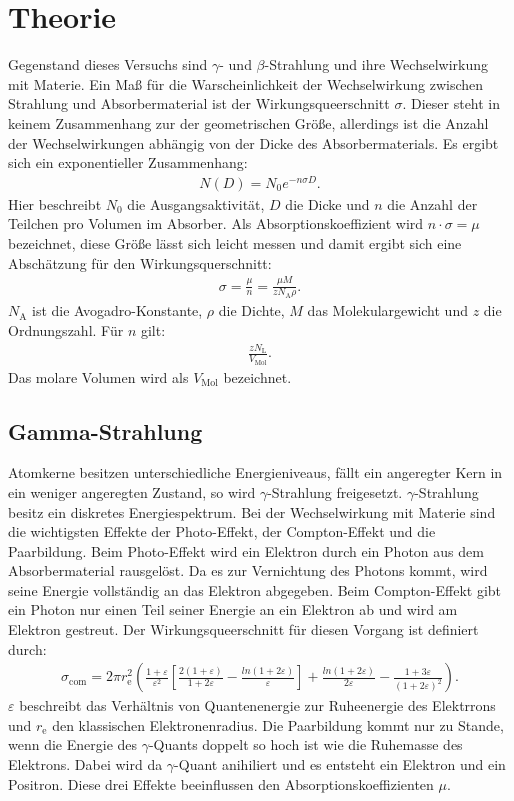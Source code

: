 \section{Theorie}
\label{sec:Theorie}
Gegenstand dieses Versuchs sind $\gamma$- und $\beta$-Strahlung und ihre Wechselwirkung mit Materie.
Ein Maß für die Warscheinlichkeit der Wechselwirkung zwischen Strahlung und Absorbermaterial ist der
Wirkungsqueerschnitt $\sigma$. Dieser steht in keinem Zusammenhang zur der geometrischen Größe, allerdings
ist die Anzahl der Wechselwirkungen abhängig von der Dicke des Absorbermaterials. Es ergibt sich ein
exponentieller Zusammenhang:
\begin{align}
N(D)=N_\mathrm{0}e^{-n\sigma D}.\label{eqn:abs}
\end{align}
Hier beschreibt $N_\mathrm{0}$ die Ausgangsaktivität, $D$ die Dicke und $n$ die Anzahl der Teilchen pro
Volumen im Absorber. Als Absorptionskoeffizient wird $n\cdot\sigma=\mu$ bezeichnet, diese Größe lässt sich
leicht messen und damit ergibt sich eine Abschätzung für den Wirkungsquerschnitt:
\begin{align}
\sigma=\frac{\mu}{n}=\frac{\mu M}{zN_\mathrm{A}\rho}.
\end{align}
$N_\mathrm{A}$ ist die Avogadro-Konstante, $\rho$ die Dichte, $M$ das Molekulargewicht und $z$ die Ordnungszahl.
Für $n$ gilt:
\begin{align}
\frac{zN_\mathrm{L}}{V_\mathrm{Mol}}.
\end{align}
Das molare Volumen wird als $V_\mathrm{Mol}$ bezeichnet.
\subsection{Gamma-Strahlung}
Atomkerne besitzen unterschiedliche Energieniveaus, fällt ein angeregter Kern in ein weniger angeregten Zustand, so
wird $\gamma$-Strahlung freigesetzt. $\gamma$-Strahlung besitz ein diskretes Energiespektrum.
Bei der Wechselwirkung mit Materie sind die wichtigsten Effekte der Photo-Effekt, der Compton-Effekt und
die Paarbildung.
Beim Photo-Effekt wird ein Elektron durch ein Photon aus dem Absorbermaterial rausgelöst. Da es zur Vernichtung des
Photons kommt, wird seine Energie vollständig an das Elektron abgegeben.
Beim Compton-Effekt gibt ein Photon nur einen Teil seiner Energie an ein Elektron ab und wird am Elektron gestreut.
Der Wirkungsqueerschnitt für diesen Vorgang ist definiert durch:
\begin{align}
\sigma_\mathrm{com}=2\pi r_\mathrm{e}^2\left(\frac{1+\varepsilon}{\varepsilon^2}\left[\frac{2(1+\varepsilon)}{1+2\varepsilon}-\frac{ln(1+2\varepsilon)}{\varepsilon}\right]+\frac{ln(1+2\varepsilon)}{2\varepsilon}-\frac{1+3\varepsilon}{(1+2\varepsilon)^2}\right)\label{eqn:sigma}.
\end{align}
$\varepsilon$ beschreibt das Verhältnis von Quantenenergie zur Ruheenergie des Elektrrons und $r_\mathrm{e}$
den klassischen Elektronenradius.
Die Paarbildung kommt nur zu Stande, wenn die Energie des $\gamma$-Quants doppelt so hoch ist wie
die Ruhemasse des Elektrons. Dabei wird da $\gamma$-Quant anihiliert und es entsteht ein Elektron und ein Positron.
Diese drei Effekte beeinflussen den Absorptionskoeffizienten $\mu$.
